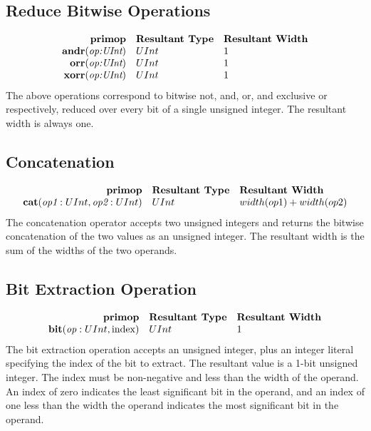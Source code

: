 \documentclass[12pt]{article}
\begin{document}
\subsection{Reduce Bitwise Operations}
\[
\begin{array}{rll}
\text{\bf primop} & \text{\bf Resultant Type} & \text{\bf Resultant Width} \\
\text{\bf andr}     (\text{\em op:UInt}) & UInt & 1    \\
\text{\bf orr}      (\text{\em op:UInt}) & UInt & 1    \\
\text{\bf xorr}     (\text{\em op:UInt}) & UInt & 1    \\
\end{array}
\]
The above operations correspond to bitwise not, and, or, and exclusive or respectively, reduced over every bit of a single unsigned integer.
The resultant width is always one.

\subsection{Concatenation}
\[
\begin{array}{rll}
\text{\bf primop} & \text{\bf Resultant Type} & \text{\bf Resultant Width} \\
\text{\bf cat}(\text{\em op1}:UInt, \text{\em op2}:UInt)  & UInt & width(op1) + width(op2)    \\
\end{array}
\]
The concatenation operator accepts two unsigned integers and returns the bitwise concatenation of the two values as an unsigned integer.
The resultant width is the sum of the widths of the two operands.

\subsection{Bit Extraction Operation}
\[
\begin{array}{rll}
\text{\bf primop} & \text{\bf Resultant Type} & \text{\bf Resultant Width} \\
\text{\bf bit}(\text{\em op}:UInt, \text{index})  & UInt & 1    \\
\end{array}
\]
The bit extraction operation accepts an unsigned integer, plus an integer literal specifying the index of the bit to extract.
The resultant value is a 1-bit unsigned integer.
The index must be non-negative and less than the width of the operand.
An index of zero indicates the least significant bit in the operand, and an index of one less than the width the operand indicates the most significant bit in the operand.
\end{document}
